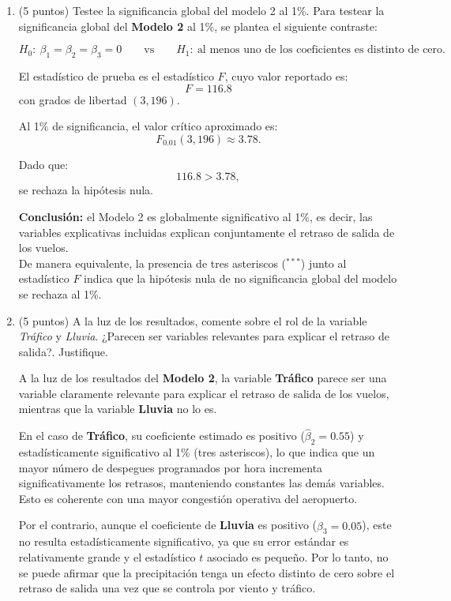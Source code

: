 \documentclass[10pt,a4paper]{article}
\begin{document}
\begin{enumerate}
\begin{enumerate}
\color{black}


    \item[(c)] (5 puntos) Testee la significancia global del modelo 2 al 1\%.
\color{blue}
Para testear la significancia global del \textbf{Modelo 2} al 1\%, se plantea el siguiente contraste:

\[
H_0:\ \beta_1=\beta_2=\beta_3=0
\qquad \text{vs} \qquad
H_1:\ \text{al menos uno de los coeficientes es distinto de cero}.
\]

El estadístico de prueba es el estadístico \(F\), cuyo valor reportado es:
\[
F = 116.8
\]
con grados de libertad \((3,196)\).

Al 1\% de significancia, el valor crítico aproximado es:
\[
F_{0.01}(3,196) \approx 3.78.
\]

Dado que:
\[
116.8 > 3.78,
\]
se rechaza la hipótesis nula.

\textbf{Conclusión:} el Modelo 2 es globalmente significativo al 1\%, es decir, las variables
explicativas incluidas explican conjuntamente el retraso de salida de los vuelos.
\\[0.3cm]
De manera equivalente, la presencia de tres asteriscos (\(^{***}\)) junto al estadístico \(F\)
indica que la hipótesis nula de no significancia global del modelo se rechaza al 1\%.

\color{black}
    \item[(d)] (5 puntos) A la luz de los resultados, comente sobre el rol de la variable \textit{Tráfico} y \textit{Lluvia}. ¿Parecen ser variables relevantes para explicar el retraso de salida?. Justifique.

\color{blue}
A la luz de los resultados del \textbf{Modelo 2}, la variable \textbf{Tráfico} parece ser una
variable claramente relevante para explicar el retraso de salida de los vuelos, mientras que
la variable \textbf{Lluvia} no lo es.

En el caso de \textbf{Tráfico}, su coeficiente estimado es positivo (\(\hat\beta_2=0.55\)) y
estadísticamente significativo al 1\% (tres asteriscos), lo que indica que un mayor número de
despegues programados por hora incrementa significativamente los retrasos, manteniendo constantes
las demás variables. Esto es coherente con una mayor congestión operativa del aeropuerto.

Por el contrario, aunque el coeficiente de \textbf{Lluvia} es positivo (\(\hat\beta_3=0.05\)),
este no resulta estadísticamente significativo, ya que su error estándar es relativamente grande
y el estadístico \(t\) asociado es pequeño. Por lo tanto, no se puede afirmar que la precipitación
tenga un efecto distinto de cero sobre el retraso de salida una vez que se controla por viento y
tráfico.


\end{enumerate}
\end{enumerate}
\end{document}
